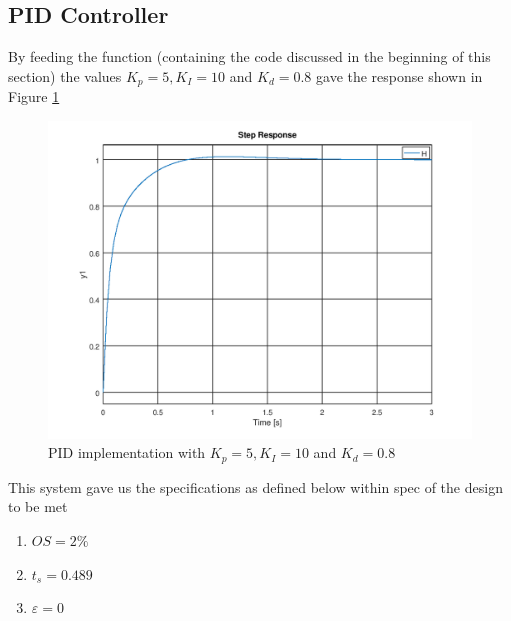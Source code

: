 \documentclass[a4paper, 12pt]{article}
\begin{document}

\subsection{PID Controller} %
\label{sub:pid_controller}
By feeding the function (containing the code discussed in the beginning of this section) the values $K_p = 5, K_I = 10$ and $K_d = 0.8$ gave the response shown in Figure \ref{fig:question_4_pid}

\begin{figure}[H]
	\centering
	\includegraphics[width=\textwidth]{Images/question_4_PID.png}
	\caption{PID implementation with $K_p = 5, K_I = 10$ and $K_d = 0.8$}
	\label{fig:question_4_pid}
\end{figure}

This system gave us the specifications as defined below within spec of the design to be met
\begin{enumerate}
	\item $OS = 2\%$
	\item $t_s = 0.489$
	\item $\varepsilon = 0$
\end{enumerate}


\end{document}

